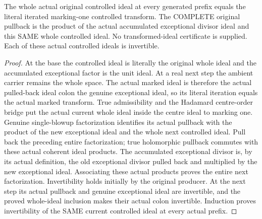 \begin{theorem}
\label{hir:general-nc-original-actual-controlled-factorization}
\leanok
The whole actual original controlled ideal at every generated prefix equals
the literal iterated marking-one controlled transform. The COMPLETE original
pullback is the product of the actual accumulated exceptional divisor ideal
and this SAME whole controlled ideal. No transformed-ideal certificate is
supplied. Each of these actual controlled ideals is invertible.
\end{theorem}
\begin{proof}
At the base the controlled ideal is literally the original whole ideal and
the accumulated exceptional factor is the unit ideal. At a real next step the
ambient carrier remains the whole space. The actual marked ideal is therefore
the actual pulled-back ideal colon the genuine exceptional ideal, so its
literal iteration equals the actual marked transform. True admissibility and
the Hadamard centre-order bridge put the actual current whole ideal inside
the centre ideal to marking one. Genuine single-blowup factorization identifies
its actual pullback with the product of the new exceptional ideal and the
whole next controlled ideal. Pull back the preceding entire factorization;
true holomorphic pullback commutes with these actual coherent ideal products.
The accumulated exceptional divisor is, by its actual definition, the old
exceptional divisor pulled back and multiplied by the new exceptional ideal.
Associating these actual products proves the entire next factorization.
Invertibility holds initially by the original producer. At the next step its
actual pullback and genuine exceptional ideal are invertible, and the proved
whole-ideal inclusion makes their actual colon invertible. Induction proves
invertibility of the SAME current controlled ideal at every actual prefix.
\end{proof}

